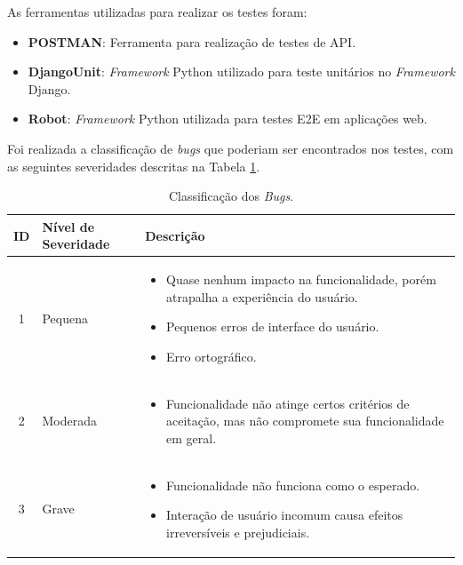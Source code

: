 As ferramentas utilizadas para realizar os testes foram:

\begin{itemize}
    \item \textbf{POSTMAN}: Ferramenta para realização de testes de API.
    \item \textbf{DjangoUnit}: \textit{Framework} Python utilizado para teste unitários no \textit{Framework} Django.
    \item \textbf{Robot}: \textit{Framework} Python utilizada para testes E2E em aplicações web.
\end{itemize}

Foi realizada a classificação de \textit{bugs} que poderiam ser encontrados nos testes, com as seguintes severidades descritas na Tabela \ref{tab:classificacao-bugs}.

\begin{table}[H]
    \centering
    \caption{Classificação dos \textit{Bugs}.}
    \label{tab:classificacao-bugs}
    \begin{tabularx}{\linewidth}{|c|l|X|}
        \hline
        \textbf{ID} & \textbf{Nível de Severidade} & \textbf{Descrição} \\
        \hline
        1 & Pequena & 
        \begin{itemize}
            \item Quase nenhum impacto na funcionalidade, porém atrapalha a experiência do usuário.
            \item Pequenos erros de interface do usuário.
            \item Erro ortográfico.
        \end{itemize}
        \\
        \hline
        2 & Moderada & 
        \begin{itemize}
            \item Funcionalidade não atinge certos critérios de aceitação, mas não compromete sua funcionalidade em geral.
        \end{itemize}
        \\
        \hline
        3 & Grave &
        \begin{itemize}
            \item Funcionalidade não funciona como o esperado.
            \item Interação de usuário incomum causa efeitos irreversíveis e prejudiciais.

\end{itemize}
\end{tabularx}
\end{table}
